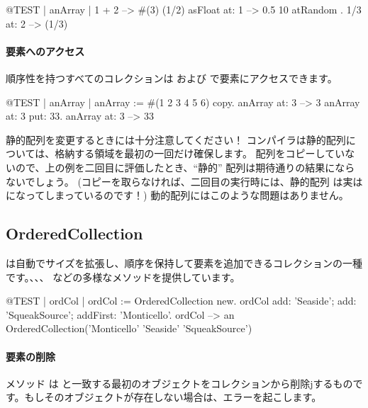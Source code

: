 \documentclass[a4paper,10pt,twoside]{book}
\begin{document}
\begin{code}{@TEST | anArray |}
{ 1 + 2 } --> #(3)
{(1/2) asFloat} at: 1 --> 0.5
{10 atRandom . 1/3} at: 2 --> (1/3)
\end{code}

\paragraph{要素へのアクセス}
順序性を持つすべてのコレクションは  および  で要素にアクセスできます。

\begin{code}{@TEST | anArray |}
anArray := #(1 2 3 4 5 6) copy.
anArray at: 3 --> 3
anArray at: 3 put: 33.
anArray at: 3 --> 33
\end{code}

\noindent
静的配列を変更するときには十分注意してください！
コンパイラは静的配列については、格納する領域を最初の一回だけ確保します。
配列をコピーしていないので、上の例を二回目に評価したとき、``静的'' 配列は期待通りの結果にならないでしょう。
(コピーを取らなければ、二回目の実行時には、静的配列  は実は  になってしまっているのです！)
動的配列にはこのような問題はありません。

\subsection{OrderedCollection}
 は自動でサイズを拡張し、順序を保持して要素を追加できるコレクションの一種です。、、、 などの多様なメソッドを提供しています。

\begin{code}{@TEST | ordCol |}
ordCol := OrderedCollection new.
ordCol add: 'Seaside'; add: 'SqueakSource'; addFirst: 'Monticello'.
ordCol --> an OrderedCollection('Monticello' 'Seaside' 'SqueakSource')
\end{code}

\paragraph{要素の削除} メソッド   は  と一致する最初のオブジェクトをコレクションから削除jするものです。もしそのオブジェクトが存在しない場合は、エラーを起こします。
\end{document}
